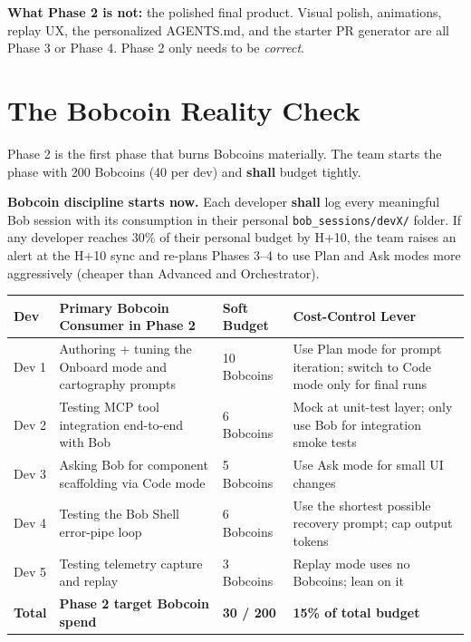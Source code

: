 \documentclass[11pt,letterpaper]{article}
\newcommand{\shall}{\textbf{shall}}
\begin{document}
\textbf{What Phase 2 is not:} the polished final product. Visual polish, animations, replay UX, the personalized AGENTS.md, and the starter PR generator are all Phase 3 or Phase 4. Phase 2 only needs to be \textit{correct}.

\section{The Bobcoin Reality Check}

Phase 2 is the first phase that burns Bobcoins materially. The team starts the phase with 200 Bobcoins (40 per dev) and \shall{} budget tightly.

\begin{warning}
\textbf{Bobcoin discipline starts now.} Each developer \shall{} log every meaningful Bob session with its consumption in their personal \texttt{bob\_sessions/devX/} folder. If any developer reaches 30\% of their personal budget by H+10, the team raises an alert at the H+10 sync and re-plans Phases 3--4 to use Plan and Ask modes more aggressively (cheaper than Advanced and Orchestrator).
\end{warning}

\begin{longtable}{|p{2.0cm}|p{5.5cm}|p{2.5cm}|p{4cm}|}
\hline
\rowcolor{ibmblue!10}
\textbf{Dev} & \textbf{Primary Bobcoin Consumer in Phase 2} & \textbf{Soft Budget} & \textbf{Cost-Control Lever} \\
\hline
Dev 1 & Authoring + tuning the Onboard mode and cartography prompts & 10 Bobcoins & Use Plan mode for prompt iteration; switch to Code mode only for final runs \\
\hline
Dev 2 & Testing MCP tool integration end-to-end with Bob & 6 Bobcoins & Mock at unit-test layer; only use Bob for integration smoke tests \\
\hline
Dev 3 & Asking Bob for component scaffolding via Code mode & 5 Bobcoins & Use Ask mode for small UI changes \\
\hline
Dev 4 & Testing the Bob Shell error-pipe loop & 6 Bobcoins & Use the shortest possible recovery prompt; cap output tokens \\
\hline
Dev 5 & Testing telemetry capture and replay & 3 Bobcoins & Replay mode uses no Bobcoins; lean on it \\
\hline
\rowcolor{ibmblue!5}
\textbf{Total} & \textbf{Phase 2 target Bobcoin spend} & \textbf{30 / 200} & \textbf{15\% of total budget} \\
\hline
\end{longtable}
\end{document}

